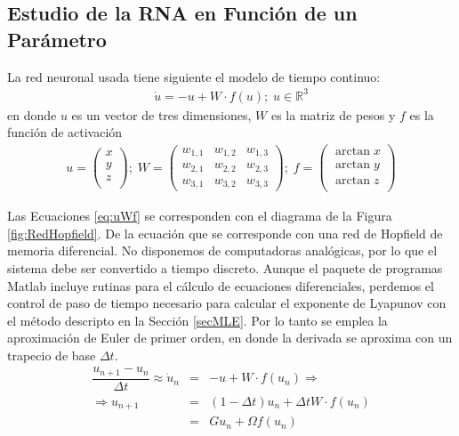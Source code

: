 \subsection{Estudio de la RNA en Función de un Parámetro}

La red neuronal usada tiene siguiente el modelo de tiempo continuo:
\begin{eqnarray}\label{eq:ModTiempCont}
\dot{u} = -u + W \cdot f(u); \; u \in \mathbb{R}^3
\end{eqnarray}
en donde $u$ es un vector de tres dimensiones, $W$ es la matriz de pesos y $f$ es la función de activación
\begin{eqnarray}\label{eq:uWf}
u =
\left( \begin{array}{c}
x\\
y\\
z\\
\end{array} \right)
; \;
W =
\left( \begin{array}{ccc}
w_{1,1} & w_{1,2} & w_{1,3}\\
w_{2,1} & w_{2,2} & w_{2,3}\\
w_{3,1} & w_{3,2} & w_{3,3}
\end{array} \right)
; \;
f =
\left( \begin{array}{c}
\arctan x\\
\arctan y\\
\arctan z\\
\end{array} \right)
\end{eqnarray}

Las Ecuaciones \ref{eq:uWf} se corresponden con el diagrama de la Figura \ref{fig:RedHopfield}.
De la ecuación que se corresponde con una red de Hopfield de memoria diferencial.
No disponemos de computadoras analógicas, por lo que el sistema debe ser convertido a tiempo discreto.
Aunque el paquete de programas Matlab incluye rutinas para el cálculo de ecuaciones diferenciales, perdemos el control de paso de tiempo necesario para calcular el exponente de Lyapunov con el método descripto en la Sección \ref{secMLE}.
Por lo tanto se emplea la aproximación de Euler de primer orden, en donde la derivada se aproxima con un trapecio de base $\Delta t$.
%
\begin{eqnarray}\label{eq:EulerRNA}
	\dfrac{u_{n+1}-u_n}{\Delta t} \approx \dot{u}_n &=& -u + W \cdot f(u_n) \Rightarrow\\ \nonumber
	\Rightarrow u_{n+1} &=& (1 - \Delta t)u_n + \Delta t W \cdot f(u_n)\\ \nonumber
						 &=& Gu_n + \Omega f(u_n)
\end{eqnarray}

